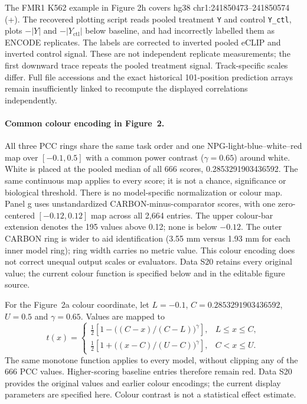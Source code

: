\documentclass[11pt]{article}
\begin{document}
The FMR1 K562 example in Figure 2h covers hg38 chr1:241850473--241850574 (+). The recovered plotting script reads pooled treatment \texttt{Y} and control \texttt{Y\_ctl}, plots $-|Y|$ and $-|Y_{\mathrm{ctl}}|$ below baseline, and had incorrectly labelled them as ENCODE replicates. The labels are corrected to inverted pooled eCLIP and inverted control signal. These are not independent replicate measurements; the first downward trace repeats the pooled treatment signal. Track-specific scales differ. Full file accessions and the exact historical 101-position prediction arrays remain insufficiently linked to recompute the displayed correlations independently.

\paragraph{Common colour encoding in Figure~2.} All three PCC rings share the same task order and one NPG-light-blue--white--red map over $[-0.1,0.5]$ with a common power contrast ($\gamma=0.65$) around white. White is placed at the pooled median of all 666 scores, 0.2853291903436592. The same continuous map applies to every score; it is not a chance, significance or biological threshold. There is no model-specific normalization or colour map. Panel g uses unstandardized CARBON-minus-comparator scores, with one zero-centered $[-0.12,0.12]$ map across all 2,664 entries. The upper colour-bar extension denotes the 195 values above 0.12; none is below $-0.12$. The outer CARBON ring is wider to aid identification (3.55 mm versus 1.93 mm for each inner model ring); ring width carries no metric value. This colour encoding does not correct unequal output scales or evaluators. Data S20 retains every original value; the current colour function is specified below and in the editable figure source.

For the Figure~2a colour coordinate, let $L=-0.1$, $C=0.2853291903436592$, $U=0.5$ and $\gamma=0.65$. Values are mapped to
\[
t(x)=\begin{cases}
\tfrac12\!\left[1-\big((C-x)/(C-L)\big)^\gamma\right],&L\leq x\leq C,\\
\tfrac12\!\left[1+\big((x-C)/(U-C)\big)^\gamma\right],&C<x\leq U.
\end{cases}
\]
The same monotone function applies to every model, without clipping any of the 666 PCC values. Higher-scoring baseline entries therefore remain red. Data S20 provides the original values and earlier colour encodings; the current display parameters are specified here. Colour contrast is not a statistical effect estimate.
\end{document}
